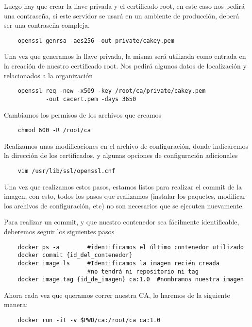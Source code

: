 \noindent Luego hay que crear la llave privada y el certificado root, en este caso nos pedirá una contraseña, si este servidor 
se usará en un ambiente de producción, deberá ser una contraseña compleja.

\begin{verbatim}
    openssl genrsa -aes256 -out private/cakey.pem

\end{verbatim}

\noindent Una vez que generamos la llave privada, la misma será utilizada como entrada en la creación de 
nuestro certificado root. Nos pedirá algunos datos de localización y relacionados a la 
organización

\begin{verbatim}
    openssl req -new -x509 -key /root/ca/private/cakey.pem 
            -out cacert.pem -days 3650
\end{verbatim}

\noindent Cambiamos los permisos de los archivos que creamos
\begin{verbatim}
    chmod 600 -R /root/ca
\end{verbatim}

\noindent Realizamos unas modificaciones en el archivo de configuración, donde indicaremos 
la dirección de los certificados, y algunas opciones de configuración adicionales
\begin{verbatim}
    vim /usr/lib/ssl/openssl.cnf
\end{verbatim}

Una vez que realizamos estos pasos, estamos listos para realizar el commit de la imagen, con esto,
todos los pasos que realizamos (instalar los paquetes, modificar los archivos de configuración, etc)
no son necesarios que se ejecuten nuevamente.

Para realizar un commit, y que nuestro contenedor sea fácilmente identificable, deberemos seguir 
los siguientes pasos

\begin{verbatim}
    docker ps -a        #identificamos el último contenedor utilizado
    docker commit {id_del_contenedor} 
    docker image ls     #Identificamos la imagen recién creada
                        #no tendrá ni repositorio ni tag
    docker image tag {id_de_imagen} ca:1.0  #nombramos nuestra imagen
\end{verbatim}




Ahora cada vez que queramos correr nuestra CA, lo haremos de la siguiente manera:
\begin{verbatim}
    docker run -it -v $PWD/ca:/root/ca ca:1.0
\end{verbatim}

